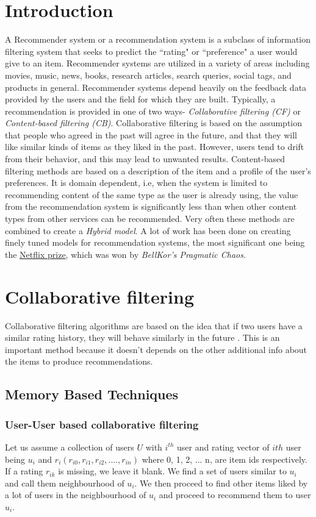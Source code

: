 \documentclass[conference]{IEEEtran}
\begin{document}
\section{Introduction}
A Recommender system or a recommendation system is a subclass of information filtering system that seeks to predict the ``rating" or ``preference" a user would give to an item. Recommender systems are utilized in a variety of areas including movies, music, news, books, research articles, search queries, social tags, and products in general.
Recommender systems depend heavily on the feedback data provided by the users and the field for which they are built.
Typically, a recommendation is provided in one of two ways- \textit{Collaborative filtering (CF)} or \textit{Content-based filtering (CB)}. Collaborative filtering is based on the assumption that people who agreed in the past will agree in the future, and that they will like similar kinds of items as they liked in the past.
However, users tend to drift from their behavior, and this may lead to unwanted results. Content-based filtering methods are based on a description of the item and a profile of the user’s preferences. It is domain dependent, i.e, when the system is limited to recommending content of the same type as the user is already using, the value from the recommendation system is significantly less than when other content types from other services can be recommended.
Very often these methods are combined to create a \textit{Hybrid model}. A lot of work has been done on creating finely tuned models for recommendation systems, the most significant one being the \href{https://www.netflixprize.com/}{Netflix prize}, which was won by \textit{BellKor's Pragmatic Chaos}\cite{b9}.

\section{Collaborative filtering}
Collaborative filtering algorithms are based on the idea that if two users have a similar rating history, they will behave similarly in the future \cite{b8}.  This is an important method because it doesn't depends on the other additional info about the items to produce recommendations.

\subsection{Memory Based Techniques}
\subsubsection{User-User based collaborative filtering}
Let us assume a collection of users \(U\) with \(i^{th}\) user and rating vector of \(ith\) user being  \(u_{i}\) and $r_{i} (r_{i0}, r_{i1}, r_{i2}, ...., r_{in})$ where 0, 1, 2, ... n, are item ids respectively. If a rating $r_{ik}$ is missing, we leave it blank. We find a set of users similar to \(u_{i}\) and call them neighbourhood of \(u_{i}\). We then proceed to find other items liked by a lot of users in the neighbourhood of \(u_{i}\) and proceed to recommend them to user \(u_{i}\).
\end{document}
